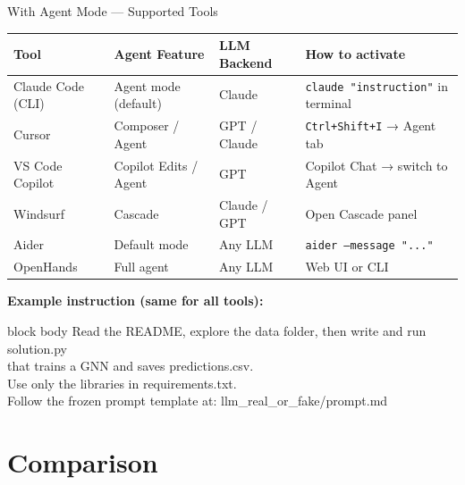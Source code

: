 \documentclass[aspectratio=169,t,10pt]{beamer}
\begin{document}
\begin{frame}{With Agent Mode --- Supported Tools}

\vspace{4pt}
\begin{center}
{\small
\begin{tabular}{@{}llll@{}}
\toprule
\textbf{Tool} & \textbf{Agent Feature} & \textbf{LLM Backend} & \textbf{How to activate} \\
\midrule
Claude Code (CLI) & Agent mode (default)   & Claude        & \texttt{claude "instruction"} in terminal \\
Cursor            & Composer / Agent       & GPT / Claude  & \texttt{Ctrl+Shift+I} → Agent tab \\
VS Code Copilot   & Copilot Edits / Agent  & GPT           & Copilot Chat → switch to Agent \\
Windsurf          & Cascade                & Claude / GPT  & Open Cascade panel \\
Aider             & Default mode           & Any LLM       & \texttt{aider --message "..."} \\
OpenHands         & Full agent             & Any LLM       & Web UI or CLI \\
\bottomrule
\end{tabular}
}
\end{center}

\vspace{6pt}
\textbf{Example instruction (same for all tools):}

\vspace{2pt}
\begin{beamercolorbox}[rounded=true,shadow=false,wd=\textwidth]{block body}
{\scriptsize\ttfamily
Read the README, explore the data folder, then write and run solution.py\\
that trains a GNN and saves predictions.csv.\\
Use only the libraries in requirements.txt.\\
Follow the frozen prompt template at: llm\_real\_or\_fake/prompt.md
}
\end{beamercolorbox}

\end{frame}

\section{Comparison}
\end{document}
